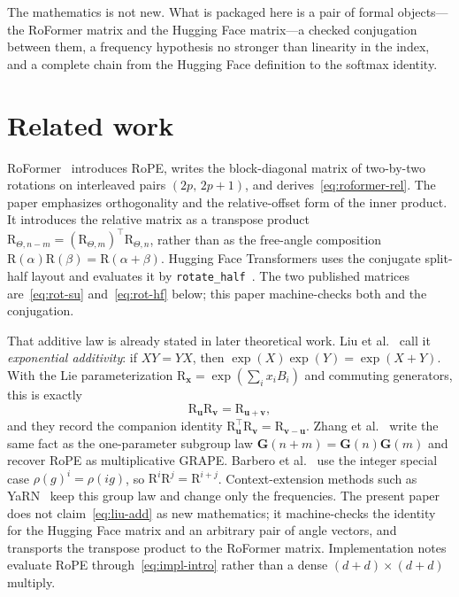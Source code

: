 \documentclass[11pt,a4paper]{article}
\newcommand{\rot}{\mathrm{R}}
\begin{document}
The mathematics is not new.
What is packaged here is a pair of formal objects---the RoFormer matrix and the Hugging Face matrix---a checked conjugation between them, a frequency hypothesis no stronger than linearity in the index, and a complete chain from the Hugging Face definition to the softmax identity.

\section{Related work}
\label{sec:related}

RoFormer~\cite{su2021roformer,su2024roformer} introduces RoPE, writes the block-diagonal matrix of two-by-two rotations on interleaved pairs \((2p,\,2p+1)\), and derives~\eqref{eq:roformer-rel}.
The paper emphasizes orthogonality and the relative-offset form of the inner product.
It introduces the relative matrix as a transpose product
\(\rot_{\Theta,n-m}=(\rot_{\Theta,m})^\top\rot_{\Theta,n}\),
rather than as the free-angle composition \(\rot(\alpha)\rot(\beta)=\rot(\alpha+\beta)\).
Hugging Face Transformers uses the conjugate split-half layout and evaluates it by \texttt{rotate\_half}~\cite{huggingface_rope_utils}.
The two published matrices are~\eqref{eq:rot-su} and~\eqref{eq:rot-hf} below; this paper machine-checks both and the conjugation.

That additive law is already stated in later theoretical work.
Liu et al.~\cite{liu2025rethinking} call it \emph{exponential additivity}:
if \(XY=YX\), then
\(\exp(X)\exp(Y)=\exp(X+Y)\).
With the Lie parameterization \(\rot_{\boldsymbol{x}}=\exp(\sum_i x_i B_i)\) and commuting generators, this is exactly
\begin{equation}
  \label{eq:liu-add}
  \rot_{\boldsymbol{u}}\rot_{\boldsymbol{v}} = \rot_{\boldsymbol{u}+\boldsymbol{v}},
\end{equation}
and they record the companion identity
\(\rot_{\boldsymbol{u}}^\top\rot_{\boldsymbol{v}}=\rot_{\boldsymbol{v}-\boldsymbol{u}}\).
Zhang et al.~\cite{zhang2025grape} write the same fact as the one-parameter subgroup law
\(\mathbf{G}(n+m)=\mathbf{G}(n)\mathbf{G}(m)\)
and recover RoPE as multiplicative GRAPE.
Barbero et al.~\cite{barbero2025round} use the integer special case
\(\rho(g)^i=\rho(ig)\), so
\(\rot^i\rot^j=\rot^{i+j}\).
Context-extension methods such as YaRN~\cite{peng2023yarn} keep this group law and change only the frequencies.
The present paper does not claim~\eqref{eq:liu-add} as new mathematics;
it machine-checks the identity for the Hugging Face matrix and an arbitrary pair of angle vectors, and transports the transpose product to the RoFormer matrix.
Implementation notes~\cite{touvron2023llama,huggingface_rope_utils} evaluate RoPE through~\eqref{eq:impl-intro} rather than a dense \((d+d)\times(d+d)\) multiply.
\end{document}
